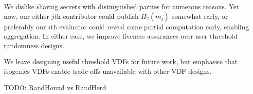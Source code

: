 \documentclass{article}
\begin{document}
We dislike sharing secrets with distinguished parties for numerous
reasons.  Yet now, our either $j$th contributor could publish $H_2(m_j)$
somewhat early, or preferably our $i$th evaluator could reveal some
partial computation early, enabling aggregation.  In either case,
we improve liveness assurances over user threshold randomness designs.

We leave designing useful threshold VDFs for future work, but emphasise
that isogenies VDFs enable trade offs unavailable with other VDF designs. 

TODO: RandHound vs RandHerd



\end{document}
